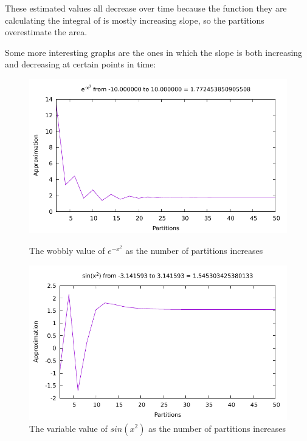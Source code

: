 \documentclass[12pt]{article}
\begin{document}
These estimated values all decrease over time because the function they are calculating the integral of is mostly increasing slope, so the partitions overestimate the area.

Some more interesting graphs are the ones in which the slope is both increasing and decreasing at certain points in time:
\begin{figure}\begin{centering}
\includegraphics{integrate2.pdf}\caption{The wobbly value of $e^{-x^2}$ as the number of partitions increases}
\includegraphics{integrate3.pdf}\caption{The variable value of $sin(x^2)$ as the number of partitions increases}
\end{centering}\end{figure}
\newpage
\end{document}
